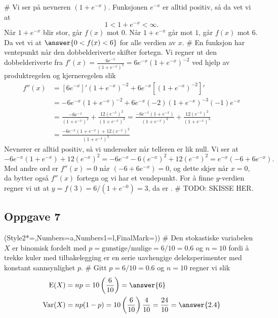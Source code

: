 \begin{easylist}[enumerate]
	# Vi ser på nevneren $(1 + e^{-x})$.
	Funksjonen $e^{-x}$ er alltid positiv, så da vet vi at
	\begin{equation*}
		1 < 1 + e^{-x} < \infty.
	\end{equation*}
	Når $1 + e^{-x}$ blir stor, går $f(x)$ mot $0$.
	Når $1 + e^{-x}$ går mot $1$, går $f(x)$ mot $6$.
	Da vet vi at $\answer{0 < f(x) < 6}$ for alle verdien av $x$.
	# En funksjon har ventepunkt når den dobbelderiverte skifter fortegn.
	Vi regner ut den dobbelderiverte fra $f'(x) = \frac{6e^{-x}}{\left(1 + e^{-x}\right)^2} = 6e^{-x} \left(1 + e^{-x}\right)^{-2} $ ved hjelp av produktregelen og kjerneregelen slik
	\begin{align*}
		f''(x) &= \left[ 6e^{-x} \right]' \left(1 + e^{-x}\right)^{-2} + 6e^{-x} \left[ \left(1 + e^{-x}\right)^{-2} \right]' \\
		&=  -6e^{-x}  \left(1 + e^{-x}\right)^{-2} + 6e^{-x} (-2)  \left(1 + e^{-x}\right)^{-3} (-1) e^{-x}  \\
		&=  \frac{-6e^{-x}}{\left(1 + e^{-x}\right)^{2}}  + \frac{12\left(e^{-x}\right)^2}{\left(1 + e^{-x}\right)^{3}} =
		 \frac{-6e^{-x} \left(1 + e^{-x}\right)}{\left(1 + e^{-x}\right)^{3}} 
		  + \frac{12\left(e^{-x}\right)^2}{\left(1 + e^{-x}\right)^{3}}\\
		 &=  \frac{-6e^{-x} \left(1 + e^{-x}\right) + 12\left(e^{-x}\right)^2}{\left(1 + e^{-x}\right)^{3}}
	\end{align*}
	Nevnerer er alltid positiv, så vi undersøker når telleren er lik null.
	Vi ser at
	\begin{equation*}
		-6e^{-x} \left(1 + e^{-x}\right) + 12\left(e^{-x}\right)^2 = 
		-6e^{-x} - 6\left(e^{-x}\right)^2 + 12\left(e^{-x}\right)^2 = 
		e^{-x} \left(-6 + 6 e^{-x}\right).
	\end{equation*}
	Med andre ord er $f''(x) = 0$ når $\left(-6 + 6 e^{-x}\right) = 0$,
	og dette skjer når $x = 0$, da bytter også $f''(x)$ fortegn og vi har et vendepunkt.
	For å finne $y$-verdien regner vi ut at $y = f(3) = 6 / (1 + e^{-0}) = 3$,
	da er .
	# TODO: SKISSE HER.
\end{easylist}

\subsection*{Oppgave 7}
\begin{easylist}[enumerate]
	\ListProperties(Style2*=,Numbers=a,Numbers1=l,FinalMark={)})
	# Den stokastiske variabelen $X$ er binomisk fordelt med $p = \text{gunstige} / \text{mulige} =  6/10 = 0.6$ og $n = 10$ fordi å trekke kuler med tilbakelegging er en serie uavhengige deleksperimenter med konstant sannsynlighet $p$.
	# Gitt $p = 6/10 = 0.6$ og $n = 10$ regner vi slik
	\begin{align*}
		\operatorname{E}(X) &= np = 10 \left(\frac{6}{10}\right) = \answer{6} \\
		\operatorname{Var}(X) &= np(1-p) = 10 \left(\frac{6}{10}\right) \frac{4}{10} = \frac{24}{10} = \answer{2.4} 
	\end{align*}
\end{easylist}

